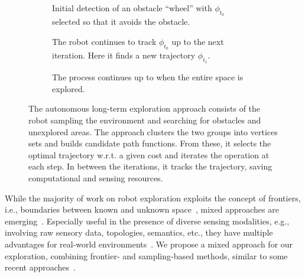 \documentclass[letterpaper,10pt,conference,twoside]{IEEEtran}
\theoremstyle{definition}
\begin{document}
\begin{figure*}
  \begin{subfigure}[m]{0.33\textwidth}
    \centering
    
    \caption{Initial detection of an obstacle ``wheel'' with $\phi_{t_0}$ selected so that it avoids the obstacle.}
    \label{fig:3-1}
  \end{subfigure}
  \hfill
  \begin{subfigure}[m]{0.32\textwidth}
    \centering
    \hspace*{-.15cm}
    
    \caption{The robot continues to track $\phi_{t_0}$ up to the next iteration. Here it finds a new trajectory $\phi_{t_1}$.}
    \label{fig:3-2}
  \end{subfigure}
  \begin{subfigure}[m]{0.33\textwidth}
    \centering
    \hspace*{.05cm}
    
    \caption{The process continues up to when the entire space is explored.}
    \label{fig:3-3}
  \end{subfigure}
  \caption{The autonomous long-term %
  exploration %
  approach consists of the robot sampling the environment and searching for obstacles and unexplored areas. The %
  approach clusters the two groups into vertices sets and builds candidate path functions. From these, it selects the optimal trajectory w.r.t. a given cost and iterates the operation at each step. In between the iterations, it tracks the trajectory, saving computational and sensing resources.}
  \label{fig:3}
\end{figure*}
\noindent
While the majority 
of work on robot exploration 
exploits the concept of frontiers, %
i.e., boundaries between known and unknown space~\cite{%
placed2022survey,dang2019graph}, mixed approaches are emerging~\cite{dai2020fast,schmid2020efficient,placed2022survey}. 
Especially useful in the presence of diverse sensing modalities, e.g., involving raw sensory data, topologies, semantics, etc., they have multiple %
advantages for real-world environments~\cite{placed2022survey,batinovic2021multi}. 
%
We propose a %
mixed approach for our %
exploration, %
combining frontier- and sampling-based methods, similar to some recent approaches~\cite{dai2020fast,%
shrestha2019learned}. %
\end{document}
